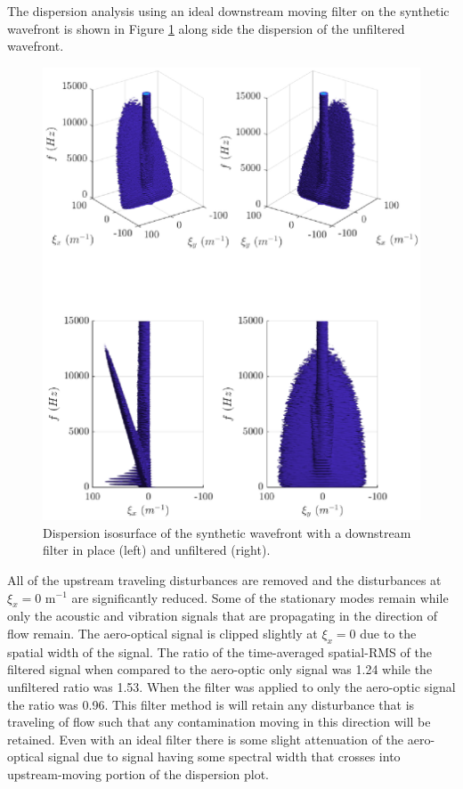 The dispersion analysis using an ideal downstream moving filter on the synthetic wavefront is shown in Figure \ref{fig:04_filter_downstream} along side the dispersion of the unfiltered wavefront.
\begin{figure}
  \centering
  \includegraphics{../matlab/04_basic_filtering/filter_downstream.eps}
  \caption{Dispersion isosurface of the synthetic wavefront with a downstream filter in place (left) and unfiltered (right).}
  \label{fig:04_filter_downstream}
\end{figure}
All of the upstream traveling disturbances are removed and the disturbances at $\xi_x=0$ m$^{-1}$ are significantly reduced.
Some of the stationary modes remain while only the acoustic and vibration signals that are propagating in the direction of flow remain.
The aero-optical signal is clipped slightly at $\xi_x=0$ due to the spatial width of the signal.
The ratio of the time-averaged spatial-RMS of the filtered signal when compared to the aero-optic only signal was 1.24 while the unfiltered ratio was 1.53.
When the filter was applied to only the aero-optic signal the ratio was 0.96.
This filter method is will retain any disturbance that is traveling of flow such that any contamination moving in this direction will be retained.
Even with an ideal filter there is some slight attenuation of the aero-optical signal due to signal having some spectral width that crosses into upstream-moving portion of the dispersion plot.


